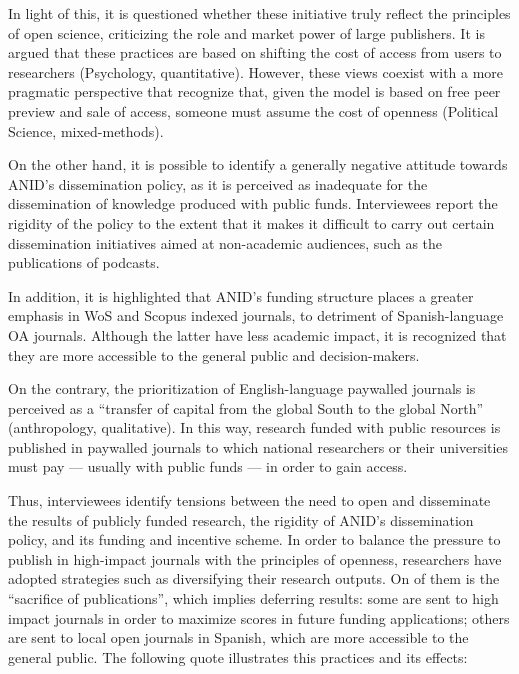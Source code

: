 \documentclass[
  letterpaper,
  DIV=11,
  numbers=noendperiod]{scrartcl}
\begin{document}
In light of this, it is questioned whether these initiative truly
reflect the principles of open science, criticizing the role and market
power of large publishers. It is argued that these practices are based
on shifting the cost of access from users to researchers (Psychology,
quantitative). However, these views coexist with a more pragmatic
perspective that recognize that, given the model is based on free peer
preview and sale of access, someone must assume the cost of openness
(Political Science, mixed-methods).

On the other hand, it is possible to identify a generally negative
attitude towards ANID's dissemination policy, as it is perceived as
inadequate for the dissemination of knowledge produced with public
funds. Interviewees report the rigidity of the policy to the extent that
it makes it difficult to carry out certain dissemination initiatives
aimed at non-academic audiences, such as the publications of podcasts.

In addition, it is highlighted that ANID's funding structure places a
greater emphasis in WoS and Scopus indexed journals, to detriment of
Spanish-language OA journals. Although the latter have less academic
impact, it is recognized that they are more accessible to the general
public and decision-makers.

On the contrary, the prioritization of English-language paywalled
journals is perceived as a ``transfer of capital from the global South
to the global North'' (anthropology, qualitative). In this way, research
funded with public resources is published in paywalled journals to which
national researchers or their universities must pay --- usually with
public funds --- in order to gain access.

Thus, interviewees identify tensions between the need to open and
disseminate the results of publicly funded research, the rigidity of
ANID's dissemination policy, and its funding and incentive scheme. In
order to balance the pressure to publish in high-impact journals with
the principles of openness, researchers have adopted strategies such as
diversifying their research outputs. On of them is the ``sacrifice of
publications'', which implies deferring results: some are sent to high
impact journals in order to maximize scores in future funding
applications; others are sent to local open journals in Spanish, which
are more accessible to the general public. The following quote
illustrates this practices and its effects:
\end{document}
